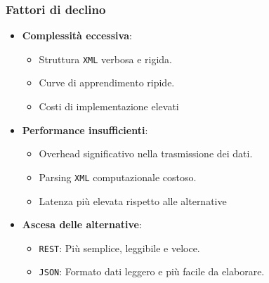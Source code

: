 \subsubsection{Fattori di declino}
\begin{itemize}
    \item \textbf{Complessità eccessiva}:
    \begin{itemize}
        \item Struttura \texttt{XML} verbosa e rigida.
        \item Curve di apprendimento ripide.
        \item Costi di implementazione elevati
    \end{itemize}
    \item \textbf{Performance insufficienti}:
    \begin{itemize}
        \item Overhead significativo nella trasmissione dei dati.
        \item Parsing \texttt{XML} computazionale costoso.
        \item Latenza più elevata rispetto alle alternative
    \end{itemize}
    \item \textbf{Ascesa delle alternative}:
    \begin{itemize}
        \item \texttt{REST}: Più semplice, leggibile e veloce.
        \item \texttt{JSON}: Formato dati leggero e più facile da elaborare.
    \end{itemize}
\end{itemize}